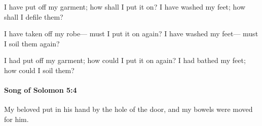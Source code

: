 			\begin{versebox}
					\item[BHS] 
					\item[LXX] 
					\item[ASV] I have put off my garment; how shall I put it on? I have washed my feet; how shall I defile them?
					\item[NIV] I have taken off my robe— must I put it on again? I have washed my feet— must I soil them again?
					\item[NRSV] I had put off my garment; how could I put it on again? I had bathed my feet; how could I soil them?
			\end{versebox}

		\paragraph{Song of Solomon 5:4} %
			\label{SONGOFSOLOMON-5-4}

			My beloved put in his hand by the hole of the door, and my bowels were moved for him.

